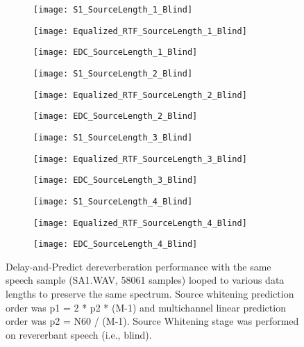 \begin{figure}[H]
	\centering
	\begin{subfigure}[b]{0.3\textwidth}
		\centering
		\texttt{[image: S1\_SourceLength\_1\_Blind]}
	\end{subfigure}
	\begin{subfigure}[b]{0.3\textwidth}
		\centering
		\texttt{[image: Equalized\_RTF\_SourceLength\_1\_Blind]}
	\end{subfigure}
	\begin{subfigure}[b]{0.3\textwidth}
		\centering
		\texttt{[image: EDC\_SourceLength\_1\_Blind]}
	\end{subfigure}
	\begin{subfigure}[b]{0.3\textwidth}
		\centering
		\texttt{[image: S1\_SourceLength\_2\_Blind]}
	\end{subfigure}
	\begin{subfigure}[b]{0.3\textwidth}
		\centering
		\texttt{[image: Equalized\_RTF\_SourceLength\_2\_Blind]}
	\end{subfigure}
	\begin{subfigure}[b]{0.3\textwidth}
		\centering
		\texttt{[image: EDC\_SourceLength\_2\_Blind]}
	\end{subfigure}
	\begin{subfigure}[b]{0.3\textwidth}
		\centering
		\texttt{[image: S1\_SourceLength\_3\_Blind]}
	\end{subfigure}
	\begin{subfigure}[b]{0.3\textwidth}
		\centering
		\texttt{[image: Equalized\_RTF\_SourceLength\_3\_Blind]}
	\end{subfigure}
	\begin{subfigure}[b]{0.3\textwidth}
		\centering
		\texttt{[image: EDC\_SourceLength\_3\_Blind]}
	\end{subfigure}
	\begin{subfigure}[b]{0.3\textwidth}
		\centering
		\texttt{[image: S1\_SourceLength\_4\_Blind]}
	\end{subfigure}
	\begin{subfigure}[b]{0.3\textwidth}
		\centering
		\texttt{[image: Equalized\_RTF\_SourceLength\_4\_Blind]}
	\end{subfigure}
	\begin{subfigure}[b]{0.3\textwidth}
		\centering
		\texttt{[image: EDC\_SourceLength\_4\_Blind]}
	\end{subfigure}
	\caption{Delay-and-Predict dereverberation performance with the same speech sample (SA1.WAV, 58061 samples) looped to various data lengths to preserve the same spectrum. Source whitening prediction order was p1 = 2 * p2 * (M-1) and multichannel linear prediction order was p2 = N60 / (M-1). Source Whitening stage was performed on revererbant speech (i.e., blind).}
	\label{fig:params_source_length_compare}
\end{figure}

